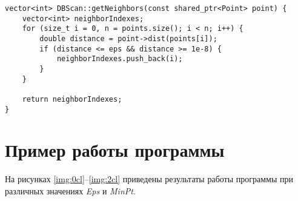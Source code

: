 \begin{lstlisting}[label=lst:getNeighbors,caption=Функция getNeighbors]
vector<int> DBScan::getNeighbors(const shared_ptr<Point> point) {
	vector<int> neighborIndexes;
	for (size_t i = 0, n = points.size(); i < n; i++) {
		double distance = point->dist(points[i]);
		if (distance <= eps && distance >= 1e-8) {
			neighborIndexes.push_back(i);
		}
	}
	
	return neighborIndexes;
}
\end{lstlisting}

\section{Пример работы программы}
На рисунках \ref{img:0cl}--\ref{img:2cl} приведены результаты работы программы при различных значениях \emph{Eps} и \emph{MinPt}. 







